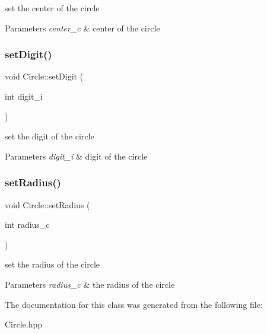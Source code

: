 set the center of the circle 
\begin{DoxyParams}{Parameters}
{\em center\+\_\+c} & center of the circle \\
\hline
\end{DoxyParams}
\mbox{\label{class_circle_a187d5c4d66124603abb89f57552b6c4c}} 
\subsubsection{\texorpdfstring{set\+Digit()}{setDigit()}}
{\footnotesize\ttfamily void Circle\+::set\+Digit (\begin{DoxyParamCaption}\item[{int}]{digit\+\_\+i }\end{DoxyParamCaption})}

set the digit of the circle 
\begin{DoxyParams}{Parameters}
{\em digit\+\_\+i} & digit of the circle \\
\hline
\end{DoxyParams}
\mbox{\label{class_circle_ae4a8bd93b437b4cf0077483ff84c8626}} 
\subsubsection{\texorpdfstring{set\+Radius()}{setRadius()}}
{\footnotesize\ttfamily void Circle\+::set\+Radius (\begin{DoxyParamCaption}\item[{int}]{radius\+\_\+c }\end{DoxyParamCaption})}

set the radius of the circle 
\begin{DoxyParams}{Parameters}
{\em radius\+\_\+c} & the radius of the circle \\
\hline
\end{DoxyParams}


The documentation for this class was generated from the following file\+:\begin{DoxyCompactItemize}
\item 
Circle.\+hpp\end{DoxyCompactItemize}
